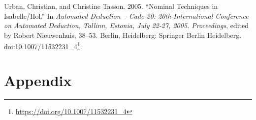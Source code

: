 \documentclass[a4paper, 12pt, twoside]{style/ociamthesis}
\theoremstyle{plain}
\theoremstyle{definition}
\theoremstyle{remark}
\renewcommand{\href}[2]{#2\footnote{\url{#1}}}
\begin{document}
\hypertarget{ref-urban05}{}
Urban, Christian, and Christine Tasson. 2005. ``Nominal Techniques in
Isabelle/Hol.'' In \emph{Automated Deduction -- Cade-20: 20th
International Conference on Automated Deduction, Tallinn, Estonia, July
22-27, 2005. Proceedings}, edited by Robert Nieuwenhuis, 38--53. Berlin,
Heidelberg: Springer Berlin Heidelberg.
doi:\href{https://doi.org/10.1007/11532231_4}{10.1007/11532231\_4}.




\setcounter{secnumdepth}{0}
\chapter*{Appendix}\label{appendix}

\newpage

\newpage
\end{document}
